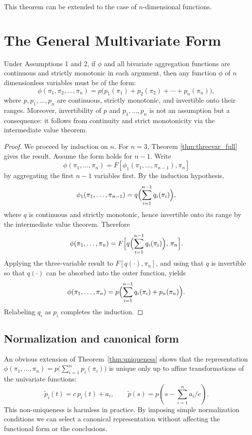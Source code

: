This theorem can be extended to the case of $n$-dimensional functions.

\section{The General Multivariate Form}\label{sec:multivariate_form}

\begin{theorem}\label{thm:universal}
Under Assumptions 1 and 2, if $\phi$ and all bivariate aggregation
functions are continuous and strictly monotonic in each argument, then
any function $\phi$ of $n$ dimensionless variables must be of the form:
\begin{equation}\label{genform1}
\boxed{\phi(\pi_1,\pi_2,\dots,\pi_n) = p\bigl(p_1(\pi_1) + p_2(\pi_2)
+ \cdots + p_n(\pi_n)\bigr)},
\end{equation}
where $p,p_1,\dots,p_n$ are continuous, strictly monotonic, and
invertible onto their ranges. Moreover, invertibility of $p$ and
$p_1,\dots,p_n$ is not an assumption but a consequence: it follows
from continuity and strict monotonicity via the intermediate value
theorem.
\end{theorem}

\begin{proof}
We proceed by induction on $n$. For $n=3$, Theorem \ref{thm:threevar_full}
gives the result. Assume the form holds for $n-1$. Write
\[
\phi(\pi_1,\dots,\pi_n) = F[\phi_1(\pi_1,\dots,\pi_{n-1}), \pi_n]
\]
by aggregating the first $n-1$ variables first. By the induction
hypothesis,
\[
\phi_1(\pi_1,\dots,\pi_{n-1}) = q\Bigl(\sum_{i=1}^{n-1} q_i(\pi_i)\Bigr),
\]
where $q$ is continuous and strictly monotonic, hence invertible onto
its range by the intermediate value theorem. Therefore
\[
\phi(\pi_1,\dots,\pi_n) = F\Bigl[q\Bigl(\sum_{i=1}^{n-1}
q_i(\pi_i)\Bigr),\, \pi_n\Bigr].
\]
Applying the three-variable result to $F[q(\cdot), \pi_n]$, and using
that $q$ is invertible so that $q(\cdot)$ can be absorbed into the
outer function, yields
\[
\phi(\pi_1,\dots,\pi_n) = p\Bigl(\sum_{i=1}^{n-1} q_i(\pi_i)
+ p_n(\pi_n)\Bigr).
\]
Relabeling $q_i$ as $p_i$ completes the induction.
\end{proof}

\subsection{Normalization and canonical form}
\label{subsec:normalization}

An obvious extension of Theorem~\ref{thm:uniqueness} shows that the representation $\phi(\pi_1,\dots,\pi_n)=p\bigl(\sum\limits_{i=1}^n p_i(\pi_i)\bigr)$ is unique only up to affine transformations of the univariate functions:
\[
\tilde p_i(t) = c\,p_i(t) + a_i,\qquad \tilde p(s) = p\!(s - \sum\limits_{i=1}^n a_i/c).
\]
This non-uniqueness is harmless in practice. By imposing simple normalization conditions we can select a canonical representation without affecting the functional form or the conclusions.

